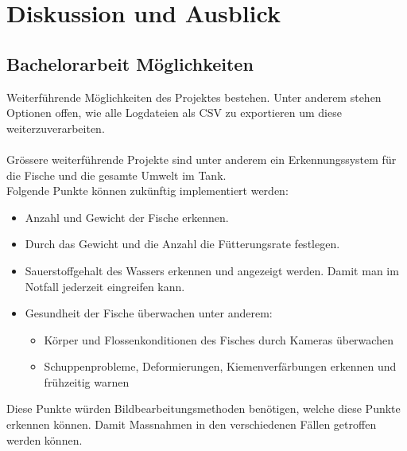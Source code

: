 \documentclass[../main.tex]{subfiles}
\begin{document}
	\section{Diskussion und Ausblick}

	\subsection{Bachelorarbeit Möglichkeiten}
	Weiterführende Möglichkeiten des Projektes bestehen. Unter anderem stehen Optionen offen, wie alle Logdateien als CSV zu exportieren um diese weiterzuverarbeiten.
	\\ \\
	Grössere weiterführende Projekte sind unter anderem ein Erkennungssystem für die Fische und die gesamte Umwelt im Tank. \\
	Folgende Punkte können zukünftig implementiert werden:
	\begin{itemize}
		\item Anzahl und Gewicht der Fische erkennen.
		\item Durch das Gewicht und die Anzahl die Fütterungsrate festlegen.
		\item Sauerstoffgehalt des Wassers erkennen und angezeigt werden. Damit man im Notfall jederzeit eingreifen kann.
		\item Gesundheit der Fische überwachen unter anderem:
		\begin{itemize}
			\item Körper und Flossenkonditionen des Fisches durch Kameras überwachen
			\item Schuppenprobleme, Deformierungen, Kiemenverfärbungen erkennen und frühzeitig warnen
		\end{itemize}
	\end{itemize}	
	Diese Punkte würden Bildbearbeitungsmethoden benötigen, welche diese Punkte erkennen können. Damit Massnahmen in den verschiedenen Fällen getroffen werden können. 
	\par 
\end{document}
